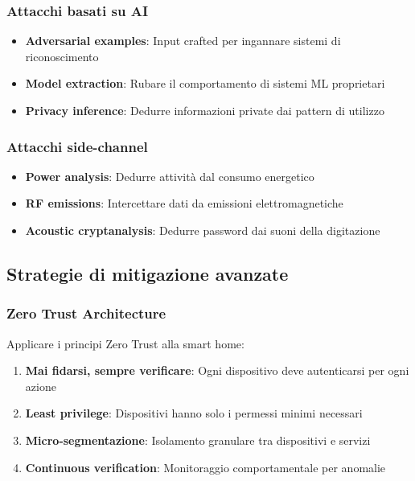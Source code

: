 \subsubsection{Attacchi basati su AI}

\begin{itemize}
    \item \textbf{Adversarial examples}: Input crafted per ingannare sistemi di riconoscimento
    \item \textbf{Model extraction}: Rubare il comportamento di sistemi ML proprietari
    \item \textbf{Privacy inference}: Dedurre informazioni private dai pattern di utilizzo
\end{itemize}

\subsubsection{Attacchi side-channel}

\begin{itemize}
    \item \textbf{Power analysis}: Dedurre attività dal consumo energetico
    \item \textbf{RF emissions}: Intercettare dati da emissioni elettromagnetiche
    \item \textbf{Acoustic cryptanalysis}: Dedurre password dai suoni della digitazione
\end{itemize}

\subsection{Strategie di mitigazione avanzate}

\subsubsection{Zero Trust Architecture}

Applicare i principi Zero Trust alla smart home:

\begin{enumerate}
    \item \textbf{Mai fidarsi, sempre verificare}: Ogni dispositivo deve autenticarsi per ogni azione
    \item \textbf{Least privilege}: Dispositivi hanno solo i permessi minimi necessari
    \item \textbf{Micro-segmentazione}: Isolamento granulare tra dispositivi e servizi
    \item \textbf{Continuous verification}: Monitoraggio comportamentale per anomalie
\end{enumerate}

